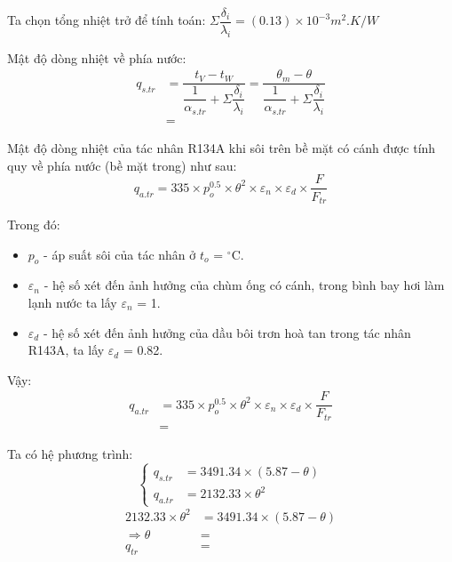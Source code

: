 Ta chọn tổng nhiệt trở để tính toán: $\Sigma \dfrac{\delta_{i}}{\lambda_{i}} = (0.13)\times 10^{-3} m^2.K/W$

Mật độ dòng nhiệt về phía nước:
\begin{equation*}
	\begin{split}
		q_{s.tr} &= \dfrac{t_{V} - t_{W}}{\dfrac{1}{\alpha_{s.tr}} + \Sigma \dfrac{\delta_{i}}{\lambda_{i}}} = \dfrac{\theta_{m} - \theta}{\dfrac{1}{\alpha_{s.tr}} + \Sigma \dfrac{\delta_{i}}{\lambda_{i}}}\\
		&=
	\end{split}
\end{equation*}

Mật độ dòng nhiệt của tác nhân R134A khi sôi trên bề mặt có cánh được tính quy về phía nước (bề mặt trong) như sau:
\begin{equation*}
	q_{a.tr} = 335\times p_{o}^{0.5}\times\theta^2\times\varepsilon_{n}\times\varepsilon_{d}\times\dfrac{F}{F_{tr}}
\end{equation*}

Trong đó:
\begin{itemize}
	\item $p_{o}$ - áp suất sôi của tác nhân ở $t_{o}$ = $^{\circ}$C.
	\item $\varepsilon_{n}$ - hệ số xét đến ảnh hưởng của chùm ống có cánh, trong bình bay hơi làm lạnh nước ta lấy $\varepsilon_{n}$ = 1.
	\item $\varepsilon_{d}$ - hệ số xét đến ảnh hưởng của dầu bôi trơn hoà tan trong tác nhân R143A, ta lấy $\varepsilon_{d}$ = 0.82.
\end{itemize}

Vậy:
\begin{equation*}
	\begin{split}
		q_{a.tr} &= 335\times p_{o}^{0.5}\times\theta^2\times\varepsilon_{n}\times\varepsilon_{d}\times\dfrac{F}{F_{tr}}\\
		&= 
	\end{split}
\end{equation*}

Ta có hệ phương trình:
\begin{equation*}
	\begin{cases}
		q_{s.tr} &= 3491.34\times(5.87 - \theta)\\
		q_{a.tr} &= 2132.33\times\theta^2
	\end{cases}
\end{equation*}
\begin{equation*}
	\begin{split}
	2132.33\times\theta^2 &= 3491.34\times(5.87 - \theta)\\
	\Rightarrow \theta &= \\
				q_{tr} &=
	\end{split}
\end{equation*}

